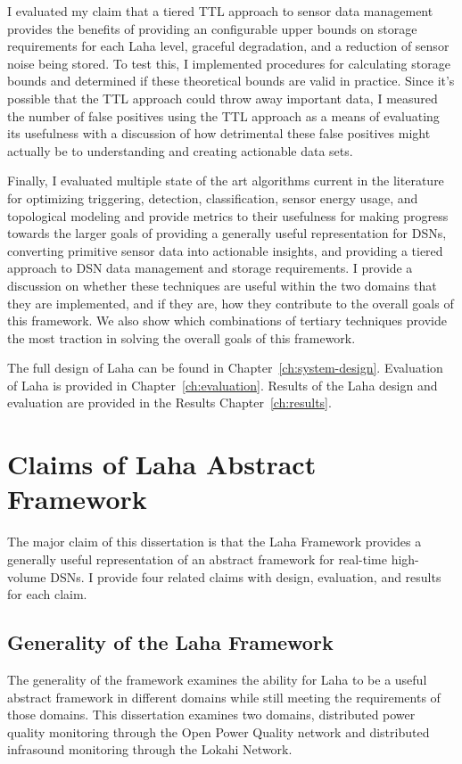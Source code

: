 I evaluated my claim that a tiered TTL approach to sensor data management provides the benefits of providing an configurable upper bounds on storage requirements for each Laha level, graceful degradation, and a reduction of sensor noise being stored. To test this, I implemented procedures for calculating storage bounds and determined if these theoretical bounds are valid in practice. Since it's possible that the TTL approach could throw away important data, I measured the number of false positives using the TTL approach as a means of evaluating its usefulness with a discussion of how detrimental these false positives might actually be to understanding and creating actionable data sets.

Finally, I evaluated multiple state of the art algorithms current in the literature for optimizing triggering, detection, classification, sensor energy usage, and topological modeling and provide metrics to their usefulness for making progress towards the larger goals of providing a generally useful representation for DSNs, converting primitive sensor data into actionable insights, and providing a tiered approach to DSN data management and storage requirements. I provide a discussion on whether these techniques are useful within the two domains that they are implemented, and if they are, how they contribute to the overall goals of this framework. We also show which combinations of tertiary techniques provide the most traction in solving the overall goals of this framework.

The full design of Laha can be found in Chapter~\ref{ch:system-design}. Evaluation of Laha is provided in Chapter~\ref{ch:evaluation}. Results of the Laha design and evaluation are provided in the Results Chapter~\ref{ch:results}.

\section{Claims of Laha Abstract Framework}\label{sec:anticipated-contributions-of-laha}

\begin{tcolorbox}
The major claim of this dissertation is that the Laha Framework provides a generally useful representation of an abstract framework for real-time high-volume DSNs. I provide four related claims with design, evaluation, and results for each claim.
\end{tcolorbox}

\subsection{Generality of the Laha Framework}\label{subsec:generality-of-the-laha-framework}
The generality of the framework examines the ability for Laha to be a useful abstract framework in different domains while still meeting the requirements of those domains. This dissertation examines two domains, distributed power quality monitoring through the Open Power Quality network and distributed infrasound monitoring through the Lokahi Network.


